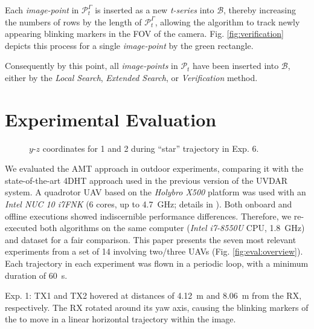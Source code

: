\documentclass[lettersize,preprint]{elsarticle}
\newcommand{\B}{$\mathcal{B}$}
\newcommand{\ts}{\emph{t-series}}
\begin{document}
Each \emph{image-point} in $\mathcal{P}_t^\Gamma$ is inserted as a new \ts{} into \B{}, thereby increasing the numbers of rows by the length of $\mathcal{P}_t^\Gamma$, allowing the algorithm to track newly appearing blinking markers in the \gls{FOV} of the camera.
Fig. \ref{fig:verification} depicts this process for a single \emph{image-point} by the green rectangle.

Consequently by this point, all \emph{image-points} in $\mathcal{P}_t$ have been inserted into \B{}, either by the \emph{Local Search}, \emph{Extended Search}, or \emph{Verification} method. 


\section{Experimental Evaluation}\label{sec:evaluation}
\begin{wrapfigure}{r}{0.25\textwidth}
    \scalebox{0.5}{}
    \caption{$y$-$z$ coordinates for 1 and 2 during \enquote{star} trajectory in Exp. 6.} 
    \label{fig:eval:star}
    \vspace*{-10pt}
\end{wrapfigure}
We evaluated the \gls{AMT} approach in outdoor experiments, comparing it with the state-of-the-art \gls{4DHT} approach \cite{walterMutualLocalizationUAVs2018} used in the previous version of the \gls{UVDAR} system. 
A quadrotor \gls{UAV} based on the \emph{Holybro X500} platform was used with an \emph{Intel NUC 10 i7FNK} (6 cores, up to \SI{4.7}{\giga\hertz}; details in \cite{hertMRSDroneModular2023}).
Both onboard and offline executions showed indiscernible performance differences.
Therefore, we re-executed both algorithms on the same computer (\emph{Intel i7-8550U} CPU, \SI{1.8}{\giga\hertz}) and dataset for a fair comparison.
This paper presents the seven most relevant experiments from a set of 14 involving two/three \glspl{UAV} (Fig. \ref{fig:eval:overview}).
Each trajectory in each experiment was flown in a periodic loop, with a minimum duration of \SI{60}{\second}.

Exp. 1:  \gls{TX}1 and \gls{TX}2 hovered at distances of \SI{4.12}{\meter} and \SI{8.06}{\meter} from the \gls{RX}, respectively. 
The \gls{RX} rotated around its yaw axis, causing the blinking markers of the  to move in a linear horizontal trajectory within the image.
\end{document}
